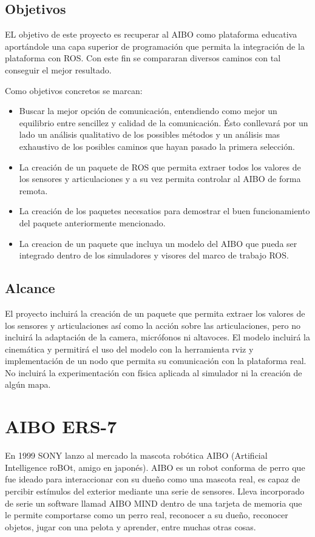 \documentclass[12pt,a4paper,final,twoside]{article}
\begin{document}
\subsection{Objetivos}
EL objetivo de este proyecto es recuperar al AIBO como plataforma educativa aportándole una capa superior de programación que permita la integración de la plataforma con ROS.
Con este fin  se compararan diversos caminos con tal conseguir el mejor resultado.

Como objetivos concretos se marcan:
\begin{itemize}
\item Buscar la mejor opción de comunicación, entendiendo como mejor un equilibrio entre sencillez y calidad de la comunicación. Ésto conllevará por un lado  un análisis qualitativo de los possibles métodos y un análisis mas exhaustivo de los posibles caminos que hayan pasado la primera selección.

\item La creación de un paquete de ROS que permita extraer todos los valores de los sensores y articulaciones y a su vez permita controlar al AIBO de forma remota.

\item La creación de los paquetes necesatios para demostrar el buen funcionamiento del paquete anteriormente mencionado.

\item La creacion de un paquete que incluya un modelo del AIBO que pueda ser integrado dentro de los simuladores y visores del marco de trabajo ROS. 
\end{itemize}

\subsection{Alcance}
El proyecto incluirá la creación de un paquete que permita extraer los valores de los sensores y articulaciones así como la acción sobre las articulaciones, pero no incluirá la adaptación de la camera, micrófonos ni altavoces.
El modelo incluirá la cinemática y permitirá el uso del modelo con la herramienta rviz y implementación de un nodo que permita su comunicación con la plataforma real. No incluirá la experimentación con física aplicada al simulador ni la creación de algún mapa.  

\newpage
\clearpage

\section{AIBO ERS-7}\label{secaibo}
En 1999 SONY lanzo al mercado la mascota robótica AIBO (Artificial Intelligence roBOt, amigo en japonés). AIBO es un robot conforma de perro 
que fue ideado para interaccionar con su dueño como una mascota real, es capaz de percibir estímulos del exterior mediante una serie de sensores. Lleva incorporado de serie un software llamad AIBO MIND dentro de una tarjeta de memoria que le permite comportarse como un perro real, reconocer a su dueño, reconocer objetos, jugar con una pelota y aprender, entre muchas otras cosas.
\end{document}
